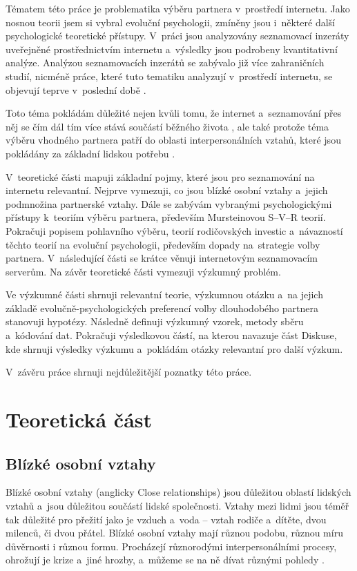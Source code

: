 \documentclass[a4paper, 12pt, notitlepage, oneside, numbers=noenddot]{report}
\begin{document}
Tématem této práce je problematika výběru partnera v~prostředí
internetu.  Jako nosnou teorii jsem si vybral evoluční psychologii,
zmíněny jsou i~některé další psychologické teoretické přístupy.
V~prá\-ci jsou analyzovány seznamovací inzeráty uveřejněné
prostřednictvím internetu a~výsledky jsou podrobeny kvantitativní
analýze.  Analýzou seznamovacích inzerátů se zabývalo již více
zahraničních studií, nicméně práce, které tuto tematiku analyzují
v~prostředí internetu, se objevují teprve v~poslední době
\citep{HallEtAl2010, EllisonEtAl2006, GibbsEtAl2006}.

Toto téma pokládám důležité nejen kvůli tomu, že internet
a~seznamování přes něj se čím dál tím více stává součástí běžného
života \citep{EllisonEtAl2006}, ale také protože téma výběru vhodného
partnera patří do oblasti interpersonálních vztahů, které jsou
pokládány za základní lidskou potřebu \citep{Slamenik2008}.

V~teoretické části mapuji základní pojmy, které jsou pro seznamování
na internetu relevantní.  Nejprve vymezuji, co jsou blízké osobní
vztahy a~jejich podmnožina partnerské vztahy.  Dále se zabývám
vybranými psychologickými přístupy k~teoriím výběru partnera,
především Mursteinovou S--V--R teorií.  Pokračuji popisem pohlavního
výběru, teo\-rií rodičovských investic a~návazností těchto teorií na
evoluční psychologii, především dopady na~strategie volby partnera.
V~následující části se krátce věnuji internetovým seznamovacím
serverům.  Na závěr teoretické části vymezuji výzkum\-ný pro\-blém.

Ve výzkumné části shrnuji relevantní teorie, výzkumnou otázku a~na
jejich základě evolučně-psychologických preferencí volby dlouhodobého
partnera stanovuji hypotézy.  Následně definuji výzkumný vzorek,
metody sběru a~kódování dat.  Pokračuji výsledkovou částí, na kterou
navazuje část Diskuse, kde shrnuji výsledky výzkumu a~pokládám otázky
relevantní pro další výzkum.

V~závěru práce shrnuji nejdůležitější poznatky této práce.

\chapter[Teoretická část]{Teoretická část}
\section{Blízké osobní vztahy}
Blízké osobní vztahy (anglicky Close relationships) jsou důležitou
oblastí lidských vztahů a~jsou důležitou součástí lidské společnosti.
Vztahy mezi lidmi jsou téměř tak důležité pro přežití jako je vzduch
a~voda -- vztah rodiče a~dítěte, dvou milenců, či dvou přátel.  Blízké
osobní vztahy mají různou podobu, různou míru důvěrnosti i různou
formu.  Procházejí různorodými interpersonálními procesy, ohrožují je
krize a~jiné hrozby, a~můžeme se na ně dívat různými pohledy
\citep{HendrickHendrick2000}.
\end{document}
